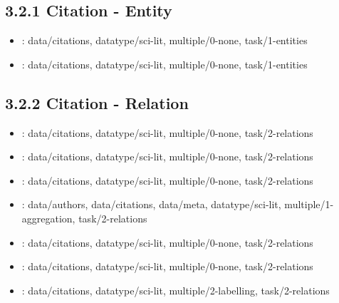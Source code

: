 \begin {refsection}
\section [3.2.1 Citation - Entity] {3.2.1 Citation - Entity}

\begin {itemize}
\item \cite {bergstroem-2006-circleview:-scalable-visualization-and-navigation-of-citation}:
    data/citations, datatype/sci-lit, multiple/0-none, task/1-entities


\item \cite {mackinlay-1995-an-organic-user-interface-for-searching-citation}:
    data/citations, datatype/sci-lit, multiple/0-none, task/1-entities


\end {itemize}
\printbibliography
\end {refsection}\pagebreak

\begin {refsection}
\section [3.2.2 Citation - Relation] {3.2.2 Citation - Relation}

\begin {itemize}
\item \cite {aris-2009-visual-overviews-for-discovering-key-papers-and-influences}:
    data/citations, datatype/sci-lit, multiple/0-none, task/2-relations


\item \cite {marks-2005-activegraph:-a-digital-library-visualization-tool}:
    data/citations, datatype/sci-lit, multiple/0-none, task/2-relations


\item \cite {garfield-2004-historiographic-mapping-of-knowledge-domains-literature}:
    data/citations, datatype/sci-lit, multiple/0-none, task/2-relations


\item \cite {henry-riche-2007-20-years-of-four-hci-conferences:-a-visual-exploration}:
    data/authors, data/citations, data/meta, datatype/sci-lit, multiple/1-aggregation, task/2-relations


\item \cite {eck-2014-citnetexplorer:-a-new-software-tool-for-analyzing-and-visualizing}:
    data/citations, datatype/sci-lit, multiple/0-none, task/2-relations


\item \cite {chen-2007-on-visualization-of-cocitation-networks}:
    data/citations, datatype/sci-lit, multiple/0-none, task/2-relations


\item \cite {small-1999-visualizing-science-by-citation-mapping}:
    data/citations, datatype/sci-lit, multiple/2-labelling, task/2-relations


\end {itemize}
\printbibliography
\end {refsection}\pagebreak

